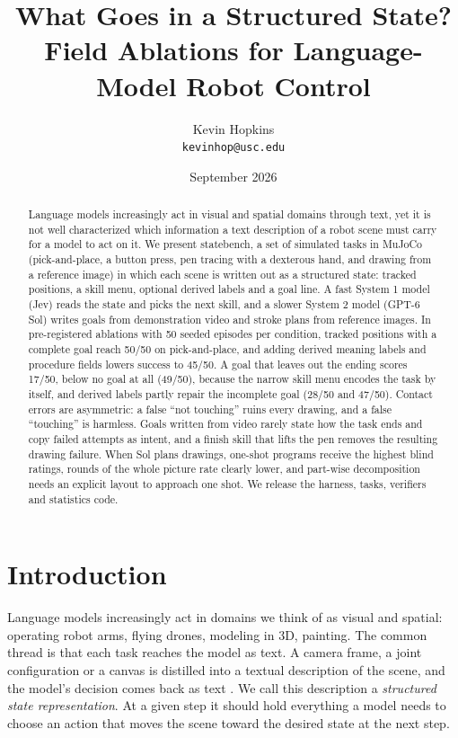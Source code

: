 \documentclass[11pt]{article}
\title{\textbf{What Goes in a Structured State?\\Field Ablations for Language-Model Robot Control}}
\author{Kevin Hopkins\\
\texttt{kevinhop@usc.edu}}
\date{September 2026}
\begin{document}
\maketitle

\begin{abstract}
\noindent
Language models increasingly act in visual and spatial domains through text, yet it is not well characterized which information a text description of a robot scene must carry for a model to act on it. We present statebench, a set of simulated tasks in MuJoCo (pick-and-place, a button press, pen tracing with a dexterous hand, and drawing from a reference image) in which each scene is written out as a structured state: tracked positions, a skill menu, optional derived labels and a goal line. A fast System 1 model (Jev) reads the state and picks the next skill, and a slower System 2 model (GPT-6 Sol) writes goals from demonstration video and stroke plans from reference images. In pre-registered ablations with 50 seeded episodes per condition, tracked positions with a complete goal reach 50/50 on pick-and-place, and adding derived meaning labels and procedure fields lowers success to 45/50. A goal that leaves out the ending scores 17/50, below no goal at all (49/50), because the narrow skill menu encodes the task by itself, and derived labels partly repair the incomplete goal (28/50 and 47/50). Contact errors are asymmetric: a false ``not touching'' ruins every drawing, and a false ``touching'' is harmless. Goals written from video rarely state how the task ends and copy failed attempts as intent, and a finish skill that lifts the pen removes the resulting drawing failure. When Sol plans drawings, one-shot programs receive the highest blind ratings, rounds of the whole picture rate clearly lower, and part-wise decomposition needs an explicit layout to approach one shot. We release the harness, tasks, verifiers and statistics code.
\end{abstract}
\section{Introduction}

Language models increasingly act in domains we think of as visual and spatial: operating robot arms, flying drones, modeling in 3D, painting. The common thread is that each task reaches the model as text. A camera frame, a joint configuration or a canvas is distilled into a textual description of the scene, and the model's decision comes back as text \citep{roon}. We call this description a \emph{structured state representation}. At a given step it should hold everything a model needs to choose an action that moves the scene toward the desired state at the next step.
\end{document}
